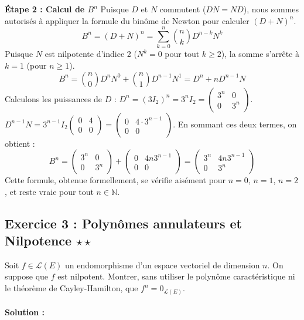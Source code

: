 \documentclass[11pt,a4paper]{article}
\begin{document}
\textbf{Étape 2 : Calcul de $B^n$}
Puisque $D$ et $N$ commutent ($DN = ND$), nous sommes autorisés à appliquer la formule du binôme de Newton pour calculer $(D+N)^n$.
$$ B^n = (D+N)^n = \sum_{k=0}^{n} \binom{n}{k} D^{n-k} N^k $$
Puisque $N$ est nilpotente d'indice 2 ($N^k = 0$ pour tout $k \geq 2$), la somme s'arrête à $k=1$ (pour $n \geq 1$).
$$ B^n = \binom{n}{0} D^n N^0 + \binom{n}{1} D^{n-1} N^1 = D^n + n D^{n-1} N $$
Calculons les puissances de $D$ :
$D^n = (3I_2)^n = 3^n I_2 = \begin{pmatrix} 3^n & 0 \\ 0 & 3^n \end{pmatrix}$.
$D^{n-1} N = 3^{n-1} I_2 \begin{pmatrix} 0 & 4 \\ 0 & 0 \end{pmatrix} = \begin{pmatrix} 0 & 4 \cdot 3^{n-1} \\ 0 & 0 \end{pmatrix}$.
En sommant ces deux termes, on obtient :
$$ B^n = \begin{pmatrix} 3^n & 0 \\ 0 & 3^n \end{pmatrix} + \begin{pmatrix} 0 & 4n 3^{n-1} \\ 0 & 0 \end{pmatrix} = \begin{pmatrix} 3^n & 4n 3^{n-1} \\ 0 & 3^n \end{pmatrix} $$
Cette formule, obtenue formellement, se vérifie aisément pour $n=0$, $n=1$, $n=2$, et reste vraie pour tout $n \in \mathbb{N}$.

\vspace{1cm}
\subsection*{Exercice 3 : Polynômes annulateurs et Nilpotence $\star\star$}

Soit $f \in \mathcal{L}(E)$ un endomorphisme d'un espace vectoriel de dimension $n$.
On suppose que $f$ est nilpotent. Montrer, sans utiliser le polynôme caractéristique ni le théorème de Cayley-Hamilton, que $f^n = 0_{\mathcal{L}(E)}$.

\paragraph*{Solution :}
\end{document}
